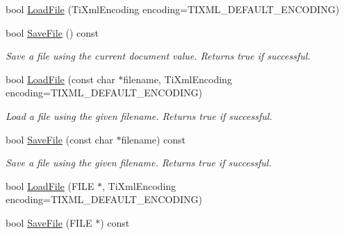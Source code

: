 \begin{DoxyCompactItemize}
\item 
bool \hyperlink{class_ti_xml_document_a4c852a889c02cf251117fd1d9fe1845f}{Load\+File} (Ti\+Xml\+Encoding encoding=T\+I\+X\+M\+L\+\_\+\+D\+E\+F\+A\+U\+L\+T\+\_\+\+E\+N\+C\+O\+D\+I\+N\+G)
\item 
\hypertarget{class_ti_xml_document_a21c0aeb0d0a720169ad4ac89523ebe93}{bool \hyperlink{class_ti_xml_document_a21c0aeb0d0a720169ad4ac89523ebe93}{Save\+File} () const }\label{class_ti_xml_document_a21c0aeb0d0a720169ad4ac89523ebe93}

\begin{DoxyCompactList}\small\item\em Save a file using the current document value. Returns true if successful. \end{DoxyCompactList}\item 
\hypertarget{class_ti_xml_document_a879cdf5e981b8b2d2ef82f2546dd28fb}{bool \hyperlink{class_ti_xml_document_a879cdf5e981b8b2d2ef82f2546dd28fb}{Load\+File} (const char $\ast$filename, Ti\+Xml\+Encoding encoding=T\+I\+X\+M\+L\+\_\+\+D\+E\+F\+A\+U\+L\+T\+\_\+\+E\+N\+C\+O\+D\+I\+N\+G)}\label{class_ti_xml_document_a879cdf5e981b8b2d2ef82f2546dd28fb}

\begin{DoxyCompactList}\small\item\em Load a file using the given filename. Returns true if successful. \end{DoxyCompactList}\item 
\hypertarget{class_ti_xml_document_ae869f5ebf7fc54c4a1d737fb4689fd44}{bool \hyperlink{class_ti_xml_document_ae869f5ebf7fc54c4a1d737fb4689fd44}{Save\+File} (const char $\ast$filename) const }\label{class_ti_xml_document_ae869f5ebf7fc54c4a1d737fb4689fd44}

\begin{DoxyCompactList}\small\item\em Save a file using the given filename. Returns true if successful. \end{DoxyCompactList}\item 
bool \hyperlink{class_ti_xml_document_a41f6fe7200864d1dca663d230caf8db6}{Load\+File} (F\+I\+L\+E $\ast$, Ti\+Xml\+Encoding encoding=T\+I\+X\+M\+L\+\_\+\+D\+E\+F\+A\+U\+L\+T\+\_\+\+E\+N\+C\+O\+D\+I\+N\+G)
\item 
\hypertarget{class_ti_xml_document_acf1672b4538c6d1d441f9f108aea2bf4}{bool \hyperlink{class_ti_xml_document_acf1672b4538c6d1d441f9f108aea2bf4}{Save\+File} (F\+I\+L\+E $\ast$) const }\label{class_ti_xml_document_acf1672b4538c6d1d441f9f108aea2bf4}


\end{DoxyCompactItemize}
